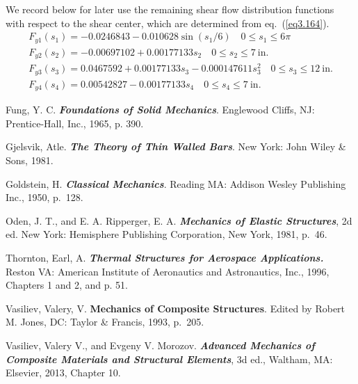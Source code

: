 \documentclass{AeroStructure-ERJohnson}
\begin{document}
\begin{example*}
We record below for later use the remaining shear flow distribution functions with respect to the shear center, which are determined from eq.~(\ref{eq3.164}).
\begin{gather}
F_{y 1}\left(s_{1}\right)=-0.0246843-0.010628 \sin \left(s_{1} / 6\right) \quad 0 \leq s_{1} \leq 6 \pi\tag{ab} \label{eq3.4.ab}\\
F_{y 2}\left(s_{2}\right)=-0.00697102+0.00177133 s_{2} \quad 0 \leq s_{2} \leq 7~\text{in.}\tag{ac} \label{eq3.4.ac}\\
F_{y 3}\left(s_{3}\right)=0.0467592+0.00177133 s_{3}-0.000147611 s_{3}^{2} \quad 0 \leq s_{3} \leq 12~\text{in.}\tag{ad} \label{eq3.4.ad}\\
F_{y 4}\left(s_{4}\right)=0.00542827-0.00177133 s_{4} \quad 0 \leq s_{4} \leq 7~\mathrm{in}. \tag{ae} \label{eq3.4.ae}
\end{gather}
\end{example*}

\vspace*{-2pc}

\begin{thebibliography}{}
\bibitem{}
Fung, Y. C.\enlargethispage{-1\baselineskip} \textbf{\textit{Foundations of Solid Mechanics}}. Englewood Cliffs, NJ: Prentice-Hall, Inc., 1965, p. 390.

\bibitem{}
Gjelsvik, Atle. \textbf{\textit{The Theory of Thin Walled Bars}}. New York: John Wiley \& Sons, 1981.

\bibitem{}
Goldstein, H. \textbf{\textit{Classical Mechanics}}. Reading MA: Addison Wesley Publishing Inc., 1950, p.~128.\label{Goldstein}

\bibitem{}
Oden, J. T., and E. A. Ripperger, E. A. \textbf{\textit{Mechanics of Elastic Structures}}, 2d ed. New York: Hemisphere Publishing Corporation, New York, 1981, p.~46.

\bibitem{}
Thornton, Earl, A. \textbf{\textit{Thermal Structures for Aerospace Applications.}} Reston VA: American Institute of Aeronautics and Astronautics, Inc., 1996, Chapters 1 and 2, and p. 51.

\bibitem{}
Vasiliev, Valery, V. \textbf{Mechanics of Composite Structures}. Edited by Robert M. Jones, DC: Taylor \& Francis, 1993, p.~205.

\bibitem{}
Vasiliev, Valery V., and Evgeny V. Morozov. \textbf{\textit{Advanced Mechanics of Composite Materials and Structural Elements}}, 3d ed., Waltham, MA: Elsevier, 2013, Chapter 10.
\end{thebibliography}

\clearemptydoublepage
\end{document}
